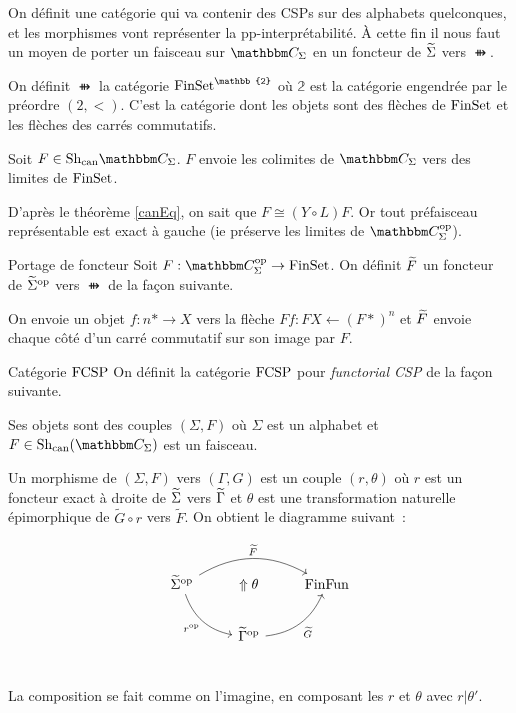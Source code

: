 
On définit une catégorie qui va contenir des CSPs sur des alphabets quelconques,
et les morphismes vont représenter la pp-interprétabilité. À cette fin il nous
faut un moyen de porter un faisceau sur $\C_\Sigma$ en un foncteur de $\widetilde{\Sigma}$
vers $\ffun$.

\begin{defi}{\ffun}
    On définit $\ffun$ la catégorie $\fset^\mathbb{2}$ où $\mathbb{2}$ est la
    catégorie engendrée par le préordre $(2,<)$. C'est la catégorie dont les
    objets sont des flèches de $\text{FinSet}$ et les flèches des carrés commutatifs.
\end{defi}

\begin{lem}
    Soit $F\in\shc{\C_\Sigma}$. $F$ envoie les colimites de $\C_\Sigma$ vers
    des limites de $\text{FinSet}$.
\end{lem}

\begin{pv}
    D'après le théorème \ref{canEq}, on sait que $F\cong (Y\circ L) F$. Or tout préfaisceau
    représentable est exact à gauche (ie préserve les limites de $\C_\Sigma^\op$).
\end{pv}

\begin{defi}{Portage de foncteur}
    Soit $F:\C_\Sigma^\op\rightarrow\fset$. On définit $\widetilde{F}$ un foncteur de
    $\widetilde{\Sigma}^{\text{op}}$ vers $\ffun$ de la façon suivante.

    On envoie un objet $f:n\ast\rightarrow X$ vers la flèche
    $F f :FX\leftarrow(F\ast)^n$ et $\widetilde{F}$ envoie chaque côté d'un
    carré commutatif sur son image par $F$.
\end{defi}

\begin{defi}{Catégorie $\text{FCSP}$}
    On définit la catégorie $\text{FCSP}$ pour \emph{functorial CSP} de la façon suivante.

    Ses objets sont des couples $(\Sigma, F)$ où $\Sigma$ est un alphabet et
    $F\in\shc(\C_\Sigma)$ est un faisceau.

    Un morphisme de $(\Sigma,F)$ vers $(\Gamma,G)$ est un couple $(r,\theta)$ où $r$
    est un foncteur exact à droite de $\widetilde{\Sigma}$ vers $\widetilde{\Gamma}$ et $\theta$ est
    une transformation naturelle épimorphique de $\tilde{G}\circ r$ vers $\tilde{F}$.
    On obtient le diagramme suivant~:

    \[\begin{tikzcd}
        \tsigma^\op\arrow[dr, bend right, swap, "r^\op"]\arrow[rr, bend left, "\tf"]
            & \Uparrow\theta
            & \ffun \\
        & \tgamma^\op\arrow[ur, bend right, swap, "\tg"] \\
    \end{tikzcd}\]

    La composition se fait comme on l'imagine, en composant les $r$ et
    $\theta$ avec $r|\theta'$.
\end{defi}


